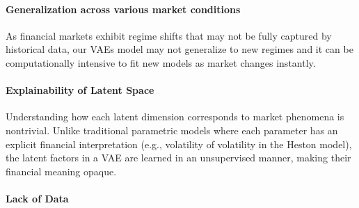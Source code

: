 \documentclass{article}
\begin{document}
\paragraph{Generalization across various market conditions}
 As financial markets exhibit regime shifts that may not be fully captured by historical data, our VAEs model may not generalize to new regimes and it can be computationally intensive to fit new models as market changes instantly.

\paragraph{Explainability of Latent Space}
Understanding how each latent dimension corresponds to market phenomena is nontrivial. Unlike traditional parametric models where each parameter has an explicit financial interpretation (e.g., volatility of volatility in the Heston model), the latent factors in a VAE are learned in an unsupervised manner, making their financial meaning opaque.
\paragraph{Lack of Data}
\end{document}
